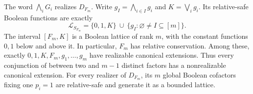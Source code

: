 \begin{proposition}
\label{core:prop:canonical-helper-lattice}
The word $\bigwedge_iG_i$ realizes $D_{F_m}$. Write
$g_I=\bigwedge_{i\in I}g_i$ and $K=\bigvee_i g_i$. Its relative-safe
Boolean functions are exactly
\[
 \mathcal L_{S_{F_m}}
 =\{0,1,K\}\ \cup\ \{g_I:\varnothing\ne I\subseteq[m]\}.
\]
The interval $[F_m,K]$ is a Boolean lattice of rank $m$, with the
constant functions $0,1$ below and above it. In particular, $F_m$ has relative conservation.
Among these, exactly $0,1,K,F_m,g_1,\ldots,g_m$ have realizable canonical
extensions. Thus every conjunction of between two and $m-1$
distinct factors has a nonrealizable canonical extension.
For every realizer of $D_{F_m}$, its $m$ global Boolean cofactors fixing
one $p_i=1$ are relative-safe and generate it as a bounded lattice.
\end{proposition}
